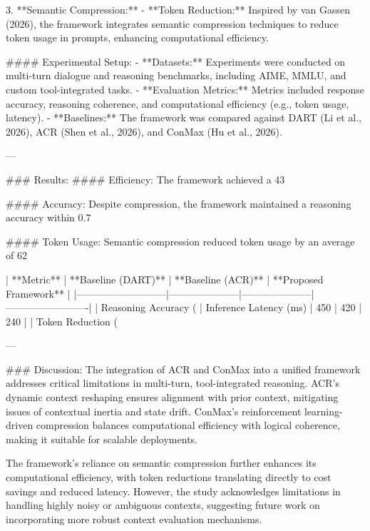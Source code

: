 3. **Semantic Compression:**
   - **Token Reduction:** Inspired by van Gassen (2026), the framework integrates semantic compression techniques to reduce token usage in prompts, enhancing computational efficiency.

#### Experimental Setup:
- **Datasets:** Experiments were conducted on multi-turn dialogue and reasoning benchmarks, including AIME, MMLU, and custom tool-integrated tasks.
- **Evaluation Metrics:** Metrics included response accuracy, reasoning coherence, and computational efficiency (e.g., token usage, latency).
- **Baselines:** The framework was compared against DART (Li et al., 2026), ACR (Shen et al., 2026), and ConMax (Hu et al., 2026).

---

### Results:
#### Efficiency:
The framework achieved a 43%

#### Accuracy:
Despite compression, the framework maintained a reasoning accuracy within 0.7%

#### Token Usage:
Semantic compression reduced token usage by an average of 62%

| **Metric**                | **Baseline (DART)** | **Baseline (ACR)** | **Proposed Framework** |
|---------------------------|---------------------|---------------------|-------------------------|
| Reasoning Accuracy (%
| Inference Latency (ms)    | 450                | 420                | 240                    |
| Token Reduction (%

---

### Discussion:
The integration of ACR and ConMax into a unified framework addresses critical limitations in multi-turn, tool-integrated reasoning. ACR's dynamic context reshaping ensures alignment with prior context, mitigating issues of contextual inertia and state drift. ConMax's reinforcement learning-driven compression balances computational efficiency with logical coherence, making it suitable for scalable deployments.

The framework's reliance on semantic compression further enhances its computational efficiency, with token reductions translating directly to cost savings and reduced latency. However, the study acknowledges limitations in handling highly noisy or ambiguous contexts, suggesting future work on incorporating more robust context evaluation mechanisms.

